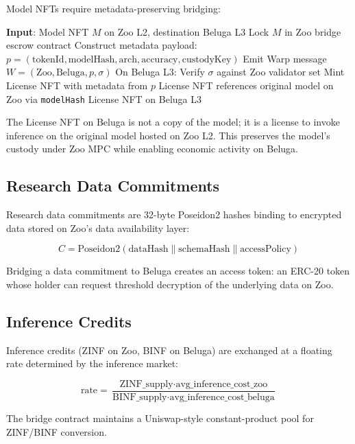 Model NFTs require metadata-preserving bridging:

\begin{algorithm}[t]
\caption{Model NFT Bridge Transfer}
\label{alg:nft-bridge}
\begin{algorithmic}[1]
\STATE \textbf{Input}: Model NFT $M$ on Zoo L2, destination Beluga L3
\STATE Lock $M$ in Zoo bridge escrow contract
\STATE Construct metadata payload:
\STATE \quad $p = (\text{tokenId}, \text{modelHash}, \text{arch}, \text{accuracy}, \text{custodyKey})$
\STATE Emit Warp message $W = (\text{Zoo}, \text{Beluga}, p, \sigma)$
\STATE On Beluga L3:
\STATE \quad Verify $\sigma$ against Zoo validator set
\STATE \quad Mint License NFT with metadata from $p$
\STATE \quad License NFT references original model on Zoo via \texttt{modelHash}
\RETURN License NFT on Beluga L3
\end{algorithmic}
\end{algorithm}

The License NFT on Beluga is not a copy of the model; it is a license to invoke inference on the original model hosted on Zoo L2. This preserves the model's custody under Zoo MPC while enabling economic activity on Beluga.

\subsection{Research Data Commitments}

Research data commitments are 32-byte Poseidon2 hashes binding to encrypted data stored on Zoo's data availability layer:

\begin{equation}
C = \text{Poseidon2}(\text{dataHash} \| \text{schemaHash} \| \text{accessPolicy})
\end{equation}

Bridging a data commitment to Beluga creates an access token: an ERC-20 token whose holder can request threshold decryption of the underlying data on Zoo.

\subsection{Inference Credits}

Inference credits (ZINF on Zoo, BINF on Beluga) are exchanged at a floating rate determined by the inference market:

\begin{equation}
\text{rate} = \frac{\text{ZINF\_supply} \cdot \text{avg\_inference\_cost\_zoo}}{\text{BINF\_supply} \cdot \text{avg\_inference\_cost\_beluga}}
\end{equation}

The bridge contract maintains a Uniswap-style constant-product pool for ZINF/BINF conversion.

